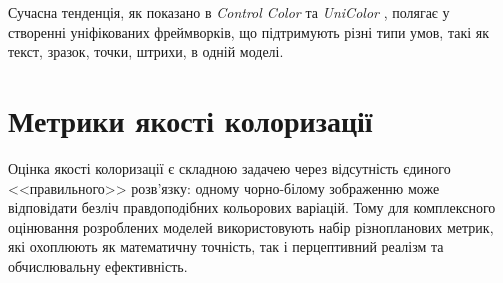         Сучасна тенденція, як показано в \textit{Control Color} \cite{2025-control-color} та \textit{UniColor} \cite{2022-unicolor}, полягає у створенні уніфікованих фреймворків, що підтримують різні типи умов, такі як текст, зразок, точки, штрихи, в одній моделі.

    \section{Метрики якості колоризації}

        Оцінка якості колоризації є складною задачею через відсутність єдиного <<правильного>> розв'язку: одному чорно-білому зображенню може відповідати безліч правдоподібних кольорових варіацій. Тому для комплексного оцінювання розроблених моделей використовують набір різнопланових метрик, які охоплюють як математичну точність, так і перцептивний реалізм та обчислювальну ефективність.

